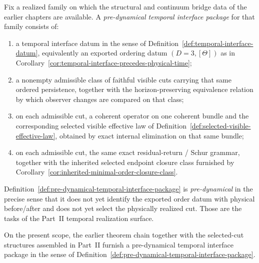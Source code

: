 \begin{definition}
\label{def:pre-dynamical-temporal-interface-package}
Fix a realized family on which the structural and continuum bridge data of the
earlier chapters are available. A \emph{pre-dynamical temporal interface package}
for that family consists of:
\begin{enumerate}[label=(\roman*), leftmargin=2em, itemsep=0.2em]
\item a temporal interface datum in the sense of
      Definition~\ref{def:temporal-interface-datum}, equivalently an exported
      ordering datum \((D=3,[\Theta])\) as in
      Corollary~\ref{cor:temporal-interface-precedes-physical-time};
\item a nonempty admissible class of faithful visible cuts carrying that same
      ordered persistence, together with the horizon-preserving equivalence
      relation by which observer changes are compared on that class;
\item on each admissible cut, a coherent operator on one coherent bundle and
      the corresponding selected visible effective law of
      Definition~\ref{def:selected-visible-effective-law}, obtained by exact
      internal elimination on that same bundle;
\item on each admissible cut, the same exact residual-return / Schur grammar,
      together with the inherited selected endpoint closure class furnished by
      Corollary~\ref{cor:inherited-minimal-order-closure-class}.
\end{enumerate}
\end{definition}

Definition~\ref{def:pre-dynamical-temporal-interface-package} is
\emph{pre-dynamical} in the precise sense that it does not yet identify the
exported order datum with physical before/after and does not yet select the
physically realized cut. Those are the tasks of the Part~II temporal
realization surface.

\begin{proposition}
\label{prop:monograph-factors-through-interface-package}
On the present scope, the earlier theorem chain together with the selected-cut
structures assembled in Part~II furnish a pre-dynamical temporal interface
package in the sense of
Definition~\ref{def:pre-dynamical-temporal-interface-package}.
\end{proposition}


